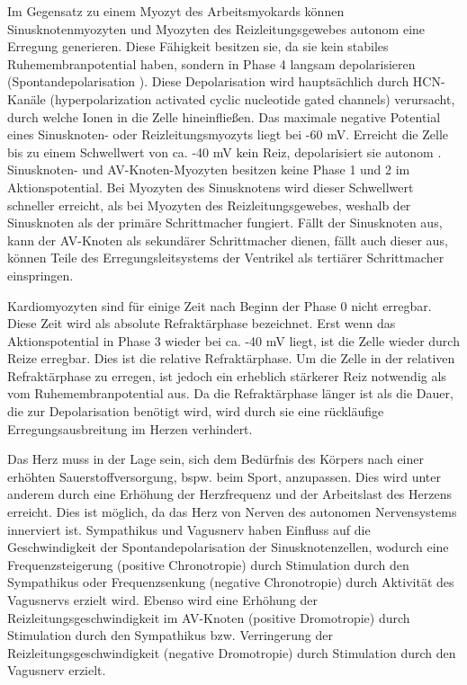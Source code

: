 Im Gegensatz zu einem Myozyt des Arbeitsmyokards können Sinusknotenmyozyten und Myozyten des Reizleitungsgewebes autonom eine Erregung generieren. Diese Fähigkeit besitzen sie, da sie kein stabiles Ruhemembranpotential haben, sondern in Phase 4 langsam depolarisieren (Spontandepolarisation \cite{schmidt_physiologie_2005}). Diese Depolarisation wird hauptsächlich durch HCN-Kanäle (hyperpolarization activated cyclic nucleotide gated channels) verursacht, durch welche Ionen in die Zelle hineinfließen. Das maximale negative Potential eines Sinusknoten- oder Reizleitungsmyozyts liegt bei -60 mV. Erreicht die Zelle bis zu einem Schwellwert von ca. -40 mV kein Reiz, depolarisiert sie autonom \cite{schmidt_physiologie_2005}. Sinusknoten- und \gls{AV-Knoten}-Myozyten besitzen keine Phase 1 und 2 im Aktionspotential. Bei Myozyten des Sinusknotens wird dieser Schwellwert schneller erreicht, als bei Myozyten des Reizleitungsgewebes, weshalb der Sinusknoten als der primäre Schrittmacher fungiert. Fällt der Sinusknoten aus, kann der \gls{AV-Knoten} als sekundärer Schrittmacher dienen, fällt auch dieser aus, können Teile des Erregungsleitsystems der Ventrikel als tertiärer Schrittmacher einspringen. \cite{gekle_taschenlehrbuch_2015}

Kardiomyozyten sind für einige Zeit nach Beginn der Phase 0 nicht erregbar. Diese Zeit wird als absolute Refraktärphase bezeichnet. Erst wenn das Aktionspotential in Phase 3 wieder bei ca. -40 mV liegt, ist die Zelle wieder durch Reize erregbar. Dies ist die relative Refraktärphase. Um die Zelle in der relativen Refraktärphase zu erregen, ist jedoch ein erheblich stärkerer Reiz notwendig als vom Ruhemembranpotential aus. Da die Refraktärphase länger ist als die Dauer, die zur Depolarisation benötigt wird, wird durch sie eine rückläufige Erregungsausbreitung im Herzen verhindert. \cite{gekle_taschenlehrbuch_2015}


Das Herz muss in der Lage sein, sich dem Bedürfnis des Körpers nach einer erhöhten Sauerstoffversorgung, bspw. beim Sport, anzupassen. Dies wird unter anderem durch eine Erhöhung der Herzfrequenz und der Arbeitslast des Herzens erreicht. Dies ist möglich, da das Herz von Nerven des autonomen Nervensystems innerviert ist. Sympathikus und Vagusnerv haben Einfluss auf die Geschwindigkeit der Spontandepolarisation der Sinusknotenzellen, wodurch eine Frequenzsteigerung (positive Chronotropie) durch Stimulation durch den Sympathikus oder Frequenzsenkung (negative Chronotropie) durch Aktivität des Vagusnervs erzielt wird. Ebenso wird eine Erhöhung der Reizleitungsgeschwindigkeit im \gls{AV-Knoten} (positive Dromotropie) durch Stimulation durch den Sympathikus bzw. Verringerung der Reizleitungsgeschwindigkeit (negative Dromotropie) durch Stimulation durch den Vagusnerv  erzielt. \cite{schmidt_physiologie_2005}

